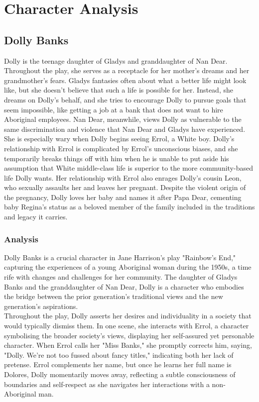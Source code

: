 \documentclass[a4paper]{article}
\begin{document}
\newpage

\section{Character Analysis}

\subsection{Dolly Banks}
Dolly is the teenage daughter of Gladys and
granddaughter of Nan Dear. Throughout the play, she serves as
a receptacle for her mother’s dreams and her grandmother’s
fears. Gladys fantasies often about what a better life might
look like, but she doesn’t believe that such a life is possible for
her. Instead, she dreams on Dolly’s behalf, and she tries to
encourage Dolly to pursue goals that seem impossible, like
getting a job at a bank that does not want to hire Aboriginal
employees. Nan Dear, meanwhile, views Dolly as vulnerable to
the same discrimination and violence that Nan Dear and
Gladys have experienced. She is especially wary when Dolly
begins seeing Errol, a White boy. Dolly’s relationship with Errol
is complicated by Errol’s unconscious biases, and she
temporarily breaks things off with him when he is unable to put
aside his assumption that White middle-class life is superior to
the more community-based life Dolly wants. Her relationship with Errol also enrages Dolly’s cousin Leon, who sexually
assaults her and leaves her pregnant. Despite the violent origin
of the pregnancy, Dolly loves her baby and names it after Papa
Dear, cementing baby Regina’s status as a beloved member of
the family included in the traditions and legacy it carries.\\

\subsubsection{Analysis}
Dolly Banks is a crucial character in Jane Harrison's play "Rainbow's End," capturing the 
experiences of a young Aboriginal woman during the 1950s, a time rife with changes and challenges 
for her community. The daughter of Gladys Banks and the granddaughter of Nan Dear, Dolly is a 
character who embodies the bridge between the prior generation's traditional views and the new 
generation's aspirations.\\

Throughout the play, Dolly asserts her desires and individuality in a society that would typically 
dismiss them. In one scene, she interacts with Errol, a character symbolising the broader society's 
views, displaying her self-assured yet personable character. When Errol calls her "Miss Banks," she 
promptly corrects him, saying, "Dolly. We’re not too fussed about fancy titles," indicating both 
her lack of pretense. Errol complements her name, but once he learns her full name is Dolores, 
Dolly momentarily moves away, reflecting a subtle consciousness of boundaries and self-respect as 
she navigates her interactions with a non-Aboriginal man.\\
\end{document}

